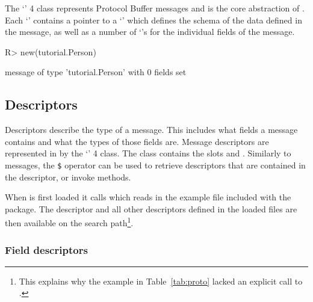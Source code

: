 \documentclass[article]{jss}
\begin{document}
The `' 4 class represents Protocol Buffer
messages and is the core abstraction of . Each
`' contains a pointer to a `' which
defines the schema of the data defined in the message, as well as a
number of `'s for the individual fields of the
message.
%
\begin{Schunk}
\begin{Sinput}
R> new(tutorial.Person)
\end{Sinput}
\begin{Soutput}
message of type 'tutorial.Person' with 0 fields set
\end{Soutput}
\end{Schunk}

\subsection{Descriptors}

Descriptors describe the type of a message.  This includes what fields
a message contains and what the types of those fields are.  Message
descriptors are represented in  by the `'
4 class. The class contains the slots  and
.  Similarly to messages, the \verb|$| operator can be used
to retrieve descriptors that are contained in the descriptor, or
invoke methods.

When  is first loaded it calls
 which reads in the example file  
included with the package.  The  descriptor
and all other descriptors defined in the loaded  files are
then available on the search path\footnote{This explains why the example in
Table~\ref{tab:proto} lacked an explicit call to
.}.

\subsubsection{Field descriptors}
\label{subsec-field-descriptor}
\end{document}
